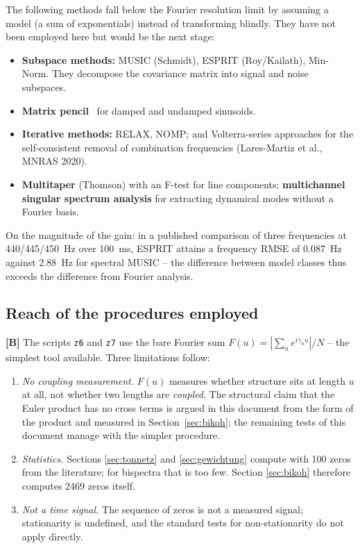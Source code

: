 The following methods fall below the Fourier resolution limit by
assuming a model (a sum of exponentials) instead of transforming
blindly. They have not been employed here but would be the next stage:

\begin{itemize}
  \item \textbf{Subspace methods:} MUSIC (Schmidt), ESPRIT
    (Roy/Kailath), Min-Norm. They decompose the covariance matrix into
    signal and noise subspaces.
  \item \textbf{Matrix pencil}~\cite{hua1990} for damped and undamped sinusoids.
  \item \textbf{Iterative methods:} RELAX, NOMP; and Volterra-series
    approaches for the self-consistent removal of combination
    frequencies (Lares-Martiz et al., MNRAS 2020).
  \item \textbf{Multitaper} (Thomson) with an F-test for line
    components; \textbf{multichannel singular spectrum analysis} for
    extracting dynamical modes without a Fourier basis.
\end{itemize}

On the magnitude of the gain: in a published comparison of three
frequencies at 440/445/450~Hz over 100~ms, ESPRIT attains a frequency
RMSE of $0.087$~Hz against $2.88$~Hz for spectral MUSIC -- the
difference between model classes thus exceeds the difference from
Fourier analysis.

\subsection{Reach of the procedures employed}

\textbf{[B]} The scripts \texttt{z6} and \texttt{z7} use the bare
Fourier sum $F(u) = |\sum_n e^{i\gamma_n u}|/N$ -- the simplest tool
available. Three limitations follow:

\begin{enumerate}
  \item \emph{No coupling measurement.} $F(u)$ measures whether
    structure sits at length $u$ at all, not whether two lengths are
    \emph{coupled}. The structural claim that the Euler product has no
    cross terms is argued in this document from the form of the
    product and measured in Section~\ref{sec:bikoh}; the remaining
    tests of this document manage with the simpler procedure.
  \item \emph{Statistics.} Sections \ref{sec:tonnetz} and
    \ref{sec:gewichtung} compute with 100 zeros from the literature;
    for bispectra that is too few. Section \ref{sec:bikoh} therefore
    computes 2469 zeros itself.
  \item \emph{Not a time signal.} The sequence of zeros is not a
    measured signal; stationarity is undefined, and the standard tests
    for non-stationarity do not apply directly.
\end{enumerate}

